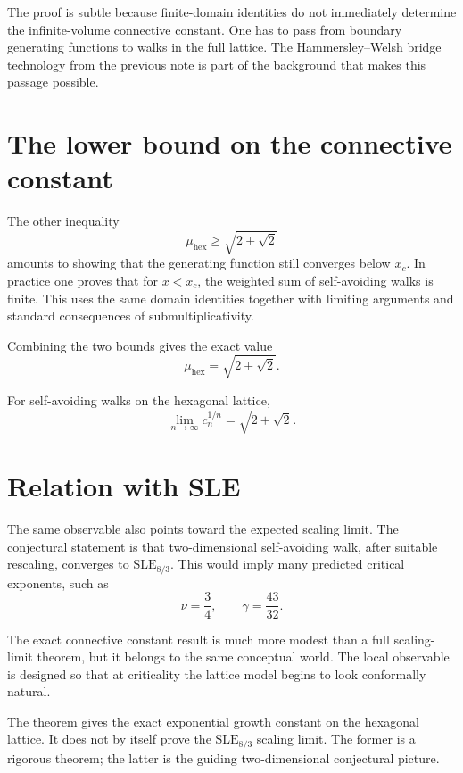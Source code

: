 The proof is subtle because finite-domain identities do not immediately determine the infinite-volume connective constant.  One has to pass from boundary generating functions to walks in the full lattice.  The Hammersley--Welsh bridge technology from the previous note is part of the background that makes this passage possible.

\section{The lower bound on the connective constant}

The other inequality
\[
  \mu_{\mathrm{hex}}\ge \sqrt{2+\sqrt2}
\]
amounts to showing that the generating function still converges below \(x_c\).  In practice one proves that for \(x<x_c\), the weighted sum of self-avoiding walks is finite.  This uses the same domain identities together with limiting arguments and standard consequences of submultiplicativity.

Combining the two bounds gives the exact value
\[
  \mu_{\mathrm{hex}}=\sqrt{2+\sqrt2}.
\]

\begin{theorem}
For self-avoiding walks on the hexagonal lattice,
\[
  \lim_{n\to\infty} c_n^{1/n}=\sqrt{2+\sqrt2}.
\]
\end{theorem}

\section{Relation with SLE}

The same observable also points toward the expected scaling limit.  The conjectural statement is that two-dimensional self-avoiding walk, after suitable rescaling, converges to \(\mathrm{SLE}_{8/3}\).  This would imply many predicted critical exponents, such as
\[
  \nu=\frac34,
  \qquad
  \gamma=\frac{43}{32}.
\]

The exact connective constant result is much more modest than a full scaling-limit theorem, but it belongs to the same conceptual world.  The local observable is designed so that at criticality the lattice model begins to look conformally natural.

\begin{remark}
The theorem gives the exact exponential growth constant on the hexagonal lattice.  It does not by itself prove the \(\mathrm{SLE}_{8/3}\) scaling limit.  The former is a rigorous theorem; the latter is the guiding two-dimensional conjectural picture.
\end{remark}

